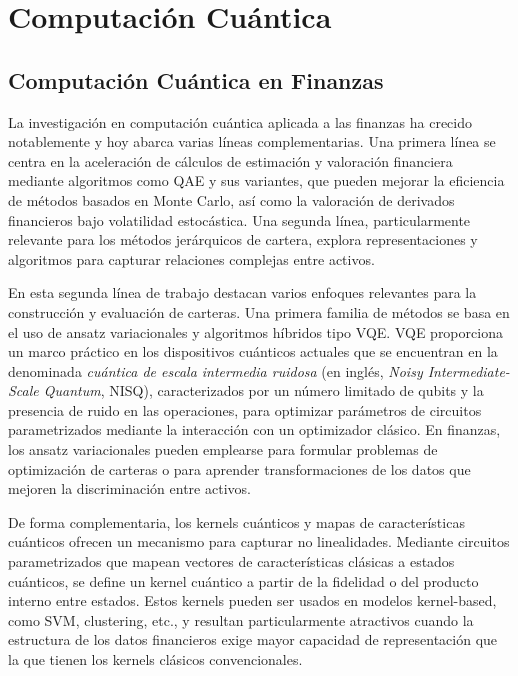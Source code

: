 \section{Computación Cuántica}
\label{sec:estado_arte_cuantica}

\subsection{Computación Cuántica en Finanzas}
\label{subsec:computacion_cuantica_en_finanzas}
La investigación en computación cuántica aplicada a las finanzas ha crecido notablemente y hoy abarca varias líneas complementarias. Una primera línea se centra en la aceleración de cálculos de estimación y valoración financiera mediante algoritmos como \gls{QAE} y sus variantes, que pueden mejorar la eficiencia de métodos basados en Monte Carlo\cite{rebentrost2018quantumportfolio,egger2019creditrisk,manzano2023rqae,miyamoto2024iqae}, así como la valoración de derivados financieros bajo volatilidad estocástica\cite{wang2024optionpricing}. Una segunda línea, particularmente relevante para los métodos jerárquicos de cartera, explora representaciones y algoritmos para capturar relaciones complejas entre activos.

En esta segunda línea de trabajo destacan varios enfoques relevantes para la construcción y evaluación de carteras. Una primera familia de métodos se basa en el uso de ansatz variacionales y algoritmos híbridos tipo \gls{VQE}\cite{peruzzo2014vqe}. \gls{VQE} proporciona un marco práctico en los dispositivos cuánticos actuales que se encuentran en la denominada \textit{cuántica de escala intermedia ruidosa} (en inglés, \textit{Noisy Intermediate-Scale Quantum}, \gls{NISQ}), caracterizados por un número limitado de qubits y la presencia de ruido en las operaciones, para optimizar parámetros de circuitos parametrizados mediante la interacción con un optimizador clásico. En finanzas, los ansatz variacionales pueden emplearse para formular problemas de optimización de carteras o para aprender transformaciones de los datos que mejoren la discriminación entre activos.

De forma complementaria, los kernels cuánticos y mapas de características cuánticos ofrecen un mecanismo para capturar no linealidades. Mediante circuitos parametrizados que mapean vectores de características clásicas a estados cuánticos, se define un kernel cuántico a partir de la fidelidad o del producto interno entre estados. Estos kernels pueden ser usados en modelos kernel-based, como \gls{SVM}\cite{cortes1995svm}, clustering\cite{scholkopf2002kernels}, etc., y resultan particularmente atractivos cuando la estructura de los datos financieros exige mayor capacidad de representación que la que tienen los kernels clásicos convencionales.

